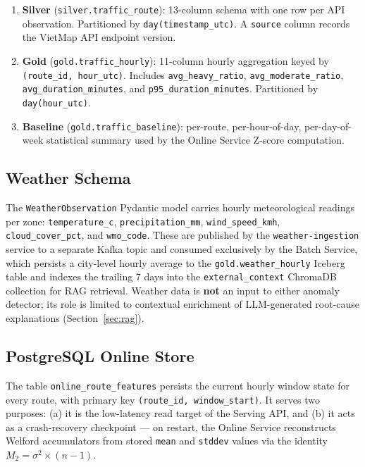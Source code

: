 \begin{enumerate}
  \item \textbf{Silver} (\texttt{silver.traffic\_route}): 13-column schema
        with one row per API observation. Partitioned by \texttt{day(timestamp\_utc)}.
        A \texttt{source} column records the VietMap API endpoint version.
  \item \textbf{Gold} (\texttt{gold.traffic\_hourly}): 11-column hourly
        aggregation keyed by \texttt{(route\_id, hour\_utc)}. Includes
        \texttt{avg\_heavy\_ratio}, \texttt{avg\_moderate\_ratio},
        \texttt{avg\_duration\_minutes}, and \texttt{p95\_duration\_minutes}.
        Partitioned by \texttt{day(hour\_utc)}.
  \item \textbf{Baseline} (\texttt{gold.traffic\_baseline}): per-route,
        per-hour-of-day, per-day-of-week statistical summary used by the
        Online Service Z-score computation.
\end{enumerate}

\subsection{Weather Schema}

The \texttt{WeatherObservation} Pydantic model carries hourly meteorological
readings per zone: \texttt{temperature\_c}, \texttt{precipitation\_mm},
\texttt{wind\_speed\_kmh}, \texttt{cloud\_cover\_pct}, and \texttt{wmo\_code}.
These are published by the \texttt{weather-ingestion} service to a separate
Kafka topic and consumed exclusively by the Batch Service, which persists a
city-level hourly average to the \texttt{gold.weather\_hourly} Iceberg table
and indexes the trailing 7 days into the \texttt{external\_context} ChromaDB
collection for RAG retrieval. Weather data is \textbf{not} an input to either
anomaly detector; its role is limited to contextual enrichment of LLM-generated
root-cause explanations (Section~\ref{sec:rag}).

\subsection{PostgreSQL Online Store}

The table \texttt{online\_route\_features} persists the current hourly window
state for every route, with primary key \texttt{(route\_id, window\_start)}.
It serves two purposes: (a) it is the low-latency read target of the Serving
API, and (b) it acts as a crash-recovery checkpoint --- on restart, the Online
Service reconstructs Welford accumulators from stored
\texttt{mean} and \texttt{stddev} values via the identity
$M_2 = \sigma^2 \times (n - 1)$.

